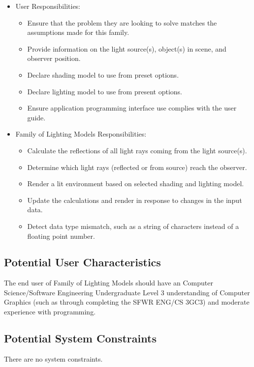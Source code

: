 \documentclass[12pt]{article}
\newcommand{\famname}{Family of Lighting Models} %
\begin{document}
\begin{itemize}
\item User Responsibilities:
\begin{itemize}
\item Ensure that the problem they are looking to solve matches the assumptions 
made for this family.
\item Provide information on the light source(s), object(s) in scene, and 
observer position.
\item Declare shading model to use from preset options.
\item Declare lighting model to use from present options.
\item Ensure application programming interface use complies with the user guide.
\end{itemize}
\item \famname{} Responsibilities:
\begin{itemize}
\item Calculate the reflections of all light rays coming from the light 
source(s).
\item Determine which light rays (reflected or from source) reach the observer.
\item Render a lit environment based on selected shading and lighting model.
\item Update the calculations and render in response to changes in the input 
data.
\item Detect data type mismatch, such as a string of characters instead of a
  floating point number.
\end{itemize}
\end{itemize}

\subsection{Potential User Characteristics} \label{SecUserCharacteristics}

The end user of \famname{} should have an Computer Science/Software Engineering 
Undergraduate Level 3 understanding of Computer Graphics (such as through 
completing the SFWR ENG/CS 3GC3) and moderate experience with programming.

\subsection{Potential System Constraints}
There are no system constraints.

%
%
\end{document}
